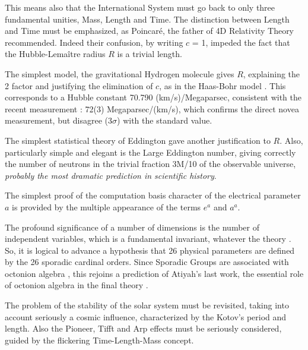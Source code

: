 \documentclass[twoside,draft]{article}
\begin{document}
\begin{sloppypar}
This means also that the International System must go back to only three fundamental unities,
Mass, Length and Time. The distinction between Length and Time must be emphasized, as
Poincar\'{e}, the father of 4D Relativity Theory recommended. Indeed their confusion, by writing $c$ =
1, impeded the fact that the Hubble-Lema\^{i}tre radius $R$ is a trivial length.

The simplest model, the gravitational Hydrogen molecule gives $R$, explaining the 2 factor and
justifying the elimination of $c$, as in the Haas-Bohr model \cite{Sanchez1}. This corresponds to a Hubble constant 70.790
(km/s)/Megaparsec, consistent with the recent measurement \cite{Bonvin}: 72(3) Megaparsec/(km/s), which
confirms the direct novea measurement, but disagree (3$\sigma$) with the standard value.

The simplest statistical theory of Eddington gave another justification to $R$. Also, particularly
simple and elegant is the Large Eddington number, giving correctly the number of neutrons in the
trivial fraction 3M/10 of the observable universe, \textit{probably the most dramatic prediction in
 scientific history}.

The simplest proof of the computation basis character of the electrical parameter $a$ is provided
by the multiple appearance of the terms $e^{a}$ and $a^{a}$.

The profound significance of a number of dimensions is the number of independent variables,
which is a fundamental invariant, whatever the theory \cite{Weigel}. So, it is logical to advance a
hypothesis that 26 physical parameters are defined by the 26 sporadic cardinal orders. Since
Sporadic Groups are associated with octonion algebra \cite{Atiyah2}, this rejoins a prediction of Atiyah's last
work, the essential role of octonion algebra in the final theory \cite{Atiyah1}.

The problem of the stability of the solar system must be revisited, taking into account
seriously a cosmic influence, characterized by the Kotov's period and length. Also the Pioneer, Tifft
and Arp effects must be seriously considered, guided by the flickering Time-Length-Mass concept.


\end{sloppypar}
\end{document}
